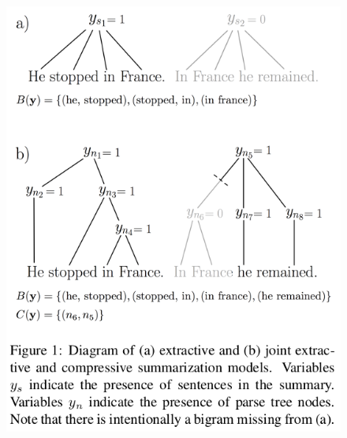 \documentclass[xcolor={table}]{beamer}
\begin{document}
\begin{frame}[t]{\cite{berg2011jointly}}
      \begin{figure}[h]
          \centering
      \includegraphics[scale=.29]{images/figure1-bergkirkpatrick11.png} \\
  \end{figure}
\end{frame}
\end{document}
